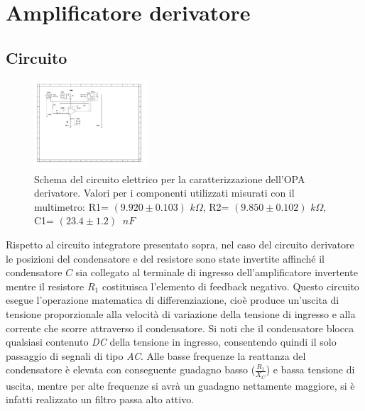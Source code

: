 \documentclass[journal]{IEEEtran}
\begin{document}
\section{\textbf{Amplificatore derivatore}} %
\subsection{\textbf{Circuito}}
\begin{figure}[H]%
\begin{center}
\includegraphics[width=0.38\textwidth]{sch-simulations/output/OPA-deriv.pdf}
\caption{Schema  del  circuito  elettrico  per  la  caratterizzazione  dell’OPA derivatore.  Valori  per  i  componenti  utilizzati  misurati  con  il  multimetro: R1= $(9.920 \pm 0.103)$ $k\Omega$, R2= $(9.850 \pm 0.102)$ $k\Omega$, C1= $(23.4 \pm 1.2)$ $\ nF$}
\label{fig:OPA-deriv}
\end{center}
\end{figure}

Rispetto al circuito integratore presentato sopra, nel caso del circuito derivatore le posizioni del condensatore e del resistore sono state invertite affinché il condensatore $C$ sia collegato al terminale di ingresso dell'amplificatore invertente mentre il resistore $R_1$ costituisca l'elemento di feedback negativo. Questo circuito esegue l'operazione matematica di differenziazione, cioè produce un'uscita di tensione proporzionale alla velocità di variazione della tensione di ingresso e alla corrente che scorre attraverso il condensatore. Si noti che il condensatore blocca qualsiasi contenuto \textit{DC} della tensione in ingresso, consentendo  quindi il solo passaggio di segnali di tipo \textit{AC}. Alle basse frequenze la reattanza del condensatore è elevata con conseguente guadagno basso ($\frac{R_1}{X_C}$) e bassa tensione di uscita, mentre per alte frequenze si avrà un guadagno nettamente maggiore, si è infatti realizzato un filtro passa alto attivo. 
\end{document}
